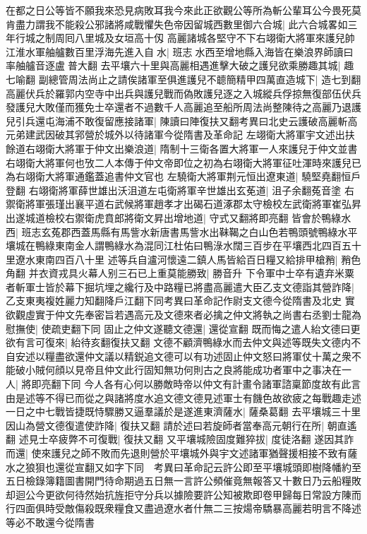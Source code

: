 在都之日公等皆不願我來恐見病敗耳我今來此正欲觀公等所為斬公輩耳公今畏死莫肯盡力謂我不能殺公邪諸將咸戰懼失色帝因留城西數里御六合城|{
	此六合城畧如三年行城之制周囘八里城及女垣高十仭}
高麗諸城各堅守不下右翊衛大將軍來護兒帥江淮水軍舳艫數百里浮海先進入自水|{
	班志水西至增地縣入海皆在樂浪界師讀曰率舳艫音逐盧普大翻}
去平壤六十里與高麗相遇進擊大破之護兒欲乘勝趣其城|{
	趣七喻翻}
副總管周法尚止之請俟諸軍至俱進護兒不聼簡精甲四萬直造城下|{
	造七到翻}
高麗伏兵於羅郭内空寺中出兵與護兒戰而偽敗護兒逐之入城縱兵俘掠無復部伍伏兵發護兒大敗僅而獲免士卒還者不過數千人高麗追至船所周法尚整陳待之高麗乃退護兒引兵還屯海浦不敢復留應接諸軍|{
	陳讀曰陣復扶又翻考異曰北史云護破高麗斬高元弟建武因破其郛營於城外以待諸軍今從隋書及革命記}
左翊衛大將軍宇文述出扶餘道右翊衛大將軍于仲文出樂浪道|{
	隋制十三衛各置大將軍一人來護兒于仲文並書右翊衛大將軍何也攷二人本傳于仲文帝即位之初為右翊衛大將軍征吐渾時來護兒已為右翊衛大將軍通鑑蓋追書仲文官也}
左驍衛大將軍荆元恒出遼東道|{
	驍堅堯翻恒戶登翻}
右翊衛將軍薛世雄出沃沮道左屯衛將軍辛世雄出玄莬道|{
	沮子余翻菟音塗}
右禦衛將軍張瑾出襄平道右武候將軍趙孝才出碣石道涿郡太守檢校左武衛將軍崔弘昇出遂城道檢校右禦衛虎賁郎將衛文昇出增地道|{
	守式又翻將即亮翻}
皆會於鴨綠水西|{
	班志玄菟郡西蓋馬縣有馬訾水新唐書馬訾水出靺鞨之白山色若鴨頭號鴨綠水平壤城在鴨綠東南金人謂鴨綠水為混同江杜佑曰鴨淥水闊三百步在平壤西北四百五十里遼水東南四百八十里}
述等兵自瀘河懷遠二鎮人馬皆給百日糧又給排甲槍矟|{
	矟色角翻}
并衣資戎具火幕人别三石已上重莫能勝致|{
	勝音升}
下令軍中士卒有遺弃米粟者斬軍士皆於幕下掘坑埋之纔行及中路糧已將盡高麗遣大臣乙支文德詣其營詐降|{
	乙支東夷複姓麗力知翻降戶江翻下同考異曰革命記作尉支文德今從隋書及北史}
實欲觀虛實于仲文先奉密旨若遇高元及文德來者必擒之仲文將執之尚書右丞劉士龍為慰撫使|{
	使疏吏翻下同}
固止之仲文遂聽文德還|{
	還從宣翻}
既而悔之遣人紿文德曰更欲有言可復來|{
	紿待亥翻復扶又翻}
文德不顧濟鴨綠水而去仲文與述等既失文德内不自安述以糧盡欲還仲文議以精鋭追文德可以有功述固止仲文怒曰將軍仗十萬之衆不能破小賊何顔以見帝且仲文此行固知無功何則古之良將能成功者軍中之事决在一人|{
	將即亮翻下同}
今人各有心何以勝敵時帝以仲文有計畫令諸軍諮稟節度故有此言由是述等不得已而從之與諸將度水追文德文德見述軍士有饑色故欲疲之每戰趣走述一日之中七戰皆捷既恃驟勝又逼羣議於是遂進東濟薩水|{
	薩桑葛翻}
去平壤城三十里因山為營文德復遣使詐降|{
	復扶又翻}
請於述曰若旋師者當奉高元朝行在所|{
	朝直遙翻}
述見士卒疲弊不可復戰|{
	復扶又翻}
又平壤城險固度難猝拔|{
	度徒洛翻}
遂因其詐而還|{
	使來護兒之師不敗而先退則營於平壤城外與宇文述諸軍猶聲援相接不致有薩水之狼狽也還從宣翻又如字下同　考異曰革命記云許公即至平壤城頭即樹降幡約至五日檢錄簿籍圖書開門待命期過五日無一言許公頻催竟無報答又十數日乃云船糧敗却迴公今更欲何待然始抗旌拒守分兵以據險要許公知被欺即卷甲歸每日常設方陳而行四面俱時受敵傷殺既衆糧食又盡過遼水者什無二三按煬帝驕暴高麗若明言不降述等必不敢還今從隋書}

